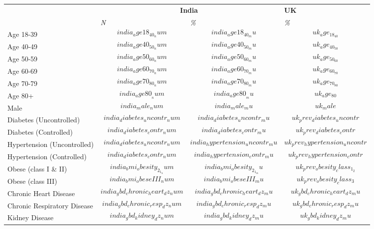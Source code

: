 
\begin{tabular}{p{6cm}p{1.5cm}p{1cm}p{1cm}}
& \multicolumn{2}{c}{\textbf{India}} & {\textbf{UK}} \\[1ex]
& \emph{{\small N}} & \emph{{\small \%}} & \emph{{\small \%}} \\[0.25ex]
Age 18-39 & $$india_age18_40_num$$ & $$india_age18_40_mu$$ & $$uk_age_18_40$$ \\[0.25ex]
Age 40-49 & $$india_age40_50_num$$ & $$india_age40_50_mu$$ & $$uk_age_40_50$$ \\[0.25ex]
Age 50-59 & $$india_age50_60_num$$ & $$india_age50_60_mu$$ & $$uk_age_50_60$$ \\[0.25ex]
Age 60-69 & $$india_age60_70_num$$ & $$india_age60_70_mu$$ & $$uk_age_60_70$$ \\[0.25ex]
Age 70-79 & $$india_age70_80_num$$ & $$india_age70_80_mu$$ & $$uk_age_70_80$$ \\[0.25ex]
Age 80+ & $$india_age80__num$$ & $$india_age80__mu$$ & $$uk_age_80$$ \\[0.25ex]
Male & $$india_male_num$$ & $$india_male_mu$$ & $$uk_male$$ \\[0.25ex]
Diabetes (Uncontrolled) & $$india_diabetes_uncontr_num$$
& $$india_diabetes_uncontr_mu$$ & $$uk_prev_diabetes_uncontr$$ \\[0.25ex]
Diabetes (Controlled) & $$india_diabetes_contr_num$$ & $$india_diabetes_contr_mu$$ & $$uk_prev_diabetes_contr$$ \\[0.25ex]
Hypertension (Uncontrolled) & $$india_diabetes_uncontr_num$$
& $$india_hypertension_uncontr_mu$$ & $$uk_prev_hypertension_uncontr$$ \\[0.25ex]
Hypertension (Controlled) & $$india_diabetes_contr_num$$ & $$india_hypertension_contr_mu$$ & $$uk_prev_hypertension_contr$$ \\[0.25ex]
Obese (class I \& II) & $$india_bmi_obesity_2_1_num$$ & $$india_bmi_obesity_2_1_mu$$ & $$uk_prev_obesity_class_1_2$$ \\[0.25ex]
Obese (class III) & $$india_bmi_obeseIII_num$$ & $$india_bmi_obeseIII_mu$$ & $$uk_prev_obesity_class_3$$ \\[0.25ex]
Chronic Heart Disease & $$india_gbd_chronic_heart_dz_num$$ & $$india_gbd_chronic_heart_dz_mu$$ & $$uk_gbd_chronic_heart_dz_mu$$ \\[0.25ex]
Chronic Respiratory  Disease & $$india_gbd_chronic_resp_dz_num$$ & $$india_gbd_chronic_resp_dz_mu$$ & $$uk_gbd_chronic_resp_dz_mu$$\\[0.25ex]
Kidney Disease & $$india_gbd_kidney_dz_num$$ & $$india_gbd_kidney_dz_mu$$ & $$uk_gbd_kidney_dz_mu$$\\[0.25ex]

\end{tabular}
